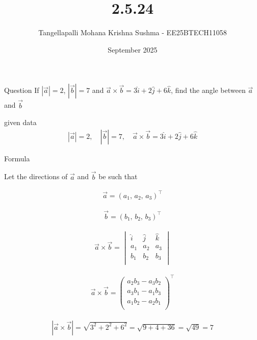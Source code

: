 \documentclass{beamer}
\title %
{2.5.24}
\date{September 2025}
\author %
{Tangellapalli Mohana Krishna Sushma - EE25BTECH11058}
\begin{document}
\frame{\titlepage}
\begin{frame}{Question}
If $|\vec{a}| = 2$, $|\vec{b}| = 7$ and $\vec{a} \times \vec{b} = 3 \hat{i} + 2 \hat{j} + 6 \hat{k}$, find the angle between $\vec{a}$ and $\vec{b}$

\end{frame}

\begin{frame}{given data}
\begin{align}
|\vec{a}| = 2, \quad |\vec{b}| = 7, \quad \vec{a} \times \vec{b} = 3\hat{i} + 2\hat{j} + 6\hat{k}
\end{align}

\end{frame}

\begin{frame}{Formula}

Let the directions of $\vec{a}$ and $\vec{b}$ be such that

\begin{align}
\vec{a} = (a_1,\, a_2,\, a_3)^{\top}
\end{align}

\begin{align}
\vec{b} = (b_1,\, b_2,\, b_3)^{\top}
\end{align}

\begin{align}
\vec{a} \times \vec{b} =
\begin{vmatrix}
\hat{i} & \hat{j} & \hat{k} \\
a_1 & a_2 & a_3 \\
b_1 & b_2 & b_3 \\
\end{vmatrix}
\end{align}

\begin{align}
\vec{a} \times \vec{b} =
\begin{pmatrix}
a_2 b_3 - a_3 b_2 \\
a_3 b_1 - a_1 b_3 \\
a_1 b_2 - a_2 b_1 \\
\end{pmatrix}^{\top}
\end{align}

\end{frame}


\begin{align}
|\vec{a} \times \vec{b}| = \sqrt{3^2 + 2^2 + 6^2} = \sqrt{9 + 4 + 36} = \sqrt{49} = 7
\end{align}
 
\end{document}
